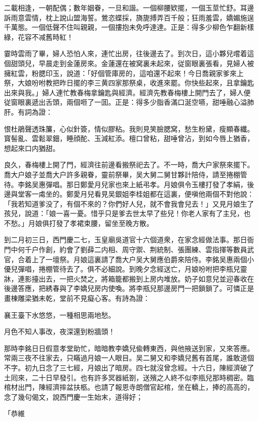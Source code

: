 二載相逢，一朝配偶；數年姻眷，一旦和諧。一個柳腰欵擺，一個玉莖忙舒。耳邊訴雨意雲情，枕上說山盟海誓。鶯恣蝶採，旖旎搏弄百千般；狂雨羞雲，嬌媚施逞千萬態。一個低聲不住叫親親，一個摟抱未免呼達達。正是：得多少柳色乍翻新樣綠，花容不减舊時紅！

霎時雲雨了畢，婦人恐怕人來，連忙出房，往後邊去了。到次日，這小夥兒嚐着這個甜頭兒，早晨走到金蓮房來。金蓮還在被窝裏未起來，従窗眼裏張看，見婦人被擁紅雲，粉腮印玉，說道：「好個管庫房的，這咱還不起來！今日喬親家爹來上祭，大娘吩咐教把昨日擺的李三黄四家那祭桌，收進來罷。你快些起來，且拿鑰匙出來與我。」婦人連忙教春梅拿鑰匙與經濟。經濟先教春梅樓上開門去了，婦人便従窗眼裏遞出舌頭，兩個咂了一囬。正是：得多少脂香滿口涎空嚥，甜唾融心溢肺肝。有詞為證：

恨杜鵑聲透珠簾，心似針簽，情似膠粘。我則見笑臉腮窝，愁生粉黛，瘦顯春纖。寳髻亂、雲鬆翠鈿，睡顔酡、玉減紅添。檀口曾粘，甜唾曾沾，到如今唇上猶香，想起來口内猶甜。

良久，春梅樓上開了門，經濟往前邊看搬祭祀去了。不一時，喬大户家祭來擺下。喬大户娘子並喬大户許多親眷，靈前祭畢，吴大舅二舅甘夥計陪侍，請至捲棚管待。李銘吴惠彈唱。那日鄭愛月兒家也來上紙弔孝。月娘俱令玉樓打發了孝絹，後邊與堂客一䖏坐的。鄭愛月兒看見吴銀姐李桂姐都在這裏，便嗔他兩個不對他說：「我若知道爹没了，有個不來的？你們好人兒，就不會我會兒去！」又見月娘生了孩兒，說道：「娘一喜一憂。惜乎只是爹去世太早了些兒！你老人家有了主兒，也不愁。」月娘俱打發了孝裙束腰，留坐至晚方散。

到二月初三日，西門慶二七，玉皇廟吳道官十六個道衆，在家念經做法事。那日衙門中何千户作創，約會了劉薛二内相、周守禦、荆統制、張團練、雲指揮等數員武官，合着上了一壇祭。月娘這裏請了喬大户吴大舅應伯爵來陪侍。李銘吴惠兩個小優兒彈唱，捲棚管待去了。俱不必細說。到晚夕念經送亡，月娘吩咐把李瓶兒靈牀，連影擡出去，一把火焚之，將箱籠都搬到上房内堆放。奶子如意兒並迎春收在後邊答應，把綉春與了李嬌兒房内使喚。將李瓶兒那邊房門一把鎖鎖了。可憐正是畫棟雕梁猶未乾，堂前不見癡心客。有詩為證：

襄王臺下水悠悠，一種相思兩地愁。

月色不知人事改，夜深還到粉牆頭！

那時李銘日日假意孝堂助忙，暗暗教李嬌兒偸轉東西，與他掖送到家，又來答應。常兩三夜不往家去，只瞞過月娘一人眼目。吴二舅又和李嬌兒舊有首尾，誰敢道個不字。初九日念了三七經，月娘出了暗房。四七就沒曾念經。十六日，陳經濟破了土囘來，二十日早發引。也有許多冥器紙劄，送殯之人終不似李瓶兒那時稠密。臨棺材出門，陳經濟摔盆扶柩。也請了報恩寺朗僧官起棺，坐在轎上，捧的高高的，念了幾句偈文，說西門慶一生始末，道得好；

「恭維

